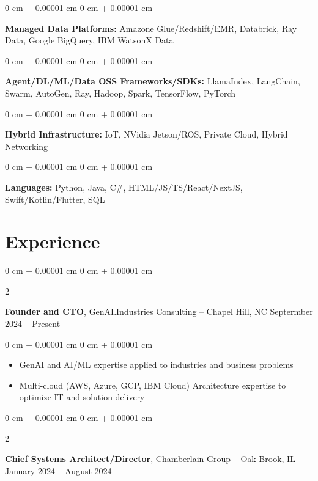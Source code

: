\documentclass[10pt, letterpaper]{article}
\newenvironment{highlights}{
    \begin{itemize}[
        topsep=0.10 cm,
        parsep=0.10 cm,
        partopsep=0pt,
        itemsep=0pt,
        leftmargin=0 cm + 10pt
    ]
}{
    \end{itemize}
} %
\newenvironment{onecolentry}{
    \begin{adjustwidth}{
        0 cm + 0.00001 cm
    }{
        0 cm + 0.00001 cm
    }
}{
    \end{adjustwidth}
} %
\newenvironment{twocolentry}[2][]{
    \onecolentry
    \def\secondColumn{#2}
    \setcolumnwidth{\fill, 4.5 cm}
    \begin{paracol}{2}
}{
    \switchcolumn \raggedleft \secondColumn
    \end{paracol}
    \endonecolentry
} %
\begin{document}
        \begin{onecolentry}
            \textbf{Managed Data Platforms:} Amazone Glue/Redshift/EMR, Databrick, Ray Data, Google BigQuery, IBM WatsonX Data
        \end{onecolentry}
        
        \begin{onecolentry}
            \textbf{Agent/DL/ML/Data OSS Frameworks/SDKs:} LlamaIndex, LangChain, Swarm, AutoGen, Ray, Hadoop, Spark, TensorFlow, PyTorch
        \end{onecolentry}       
        
        \begin{onecolentry}
            \textbf{Hybrid Infrastructure:} IoT, NVidia Jetson/ROS, Private Cloud, Hybrid Networking
        \end{onecolentry}        

        \begin{onecolentry}
            \textbf{Languages:} Python, Java, C\#, HTML/JS/TS/React/NextJS, Swift/Kotlin/Flutter, SQL
        \end{onecolentry}

    \section{Experience}
        
        \begin{twocolentry}{
            Septermber 2024 – Present
        }
            \textbf{Founder and CTO}, GenAI.Industries Consulting -- Chapel Hill, NC\end{twocolentry}

        \vspace{0.10 cm}
        \begin{onecolentry}
            \begin{highlights}
                \item GenAI and AI/ML expertise applied to industries and business problems
                \item Multi-cloud (AWS, Azure, GCP, IBM Cloud)  Architecture expertise to optimize IT and solution delivery 
            \end{highlights}
        \end{onecolentry}


        \vspace{0.2 cm}

        \begin{twocolentry}{
            January 2024 – August 2024
        }
            \textbf{Chief Systems Architect/Director}, Chamberlain Group -- Oak Brook, IL\end{twocolentry}
\end{document}

